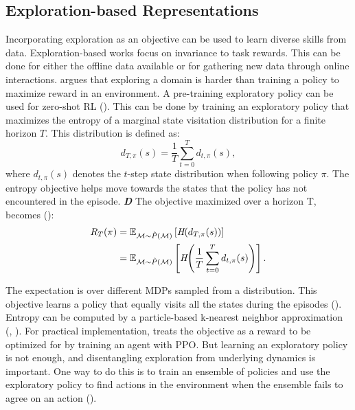 \documentclass{article}
\begin{document}
\subsection{Exploration-based Representations}
Incorporating exploration as an objective can be used to learn diverse skills from data. Exploration-based works focus on invariance to task rewards. This can be done for either the offline data available or for gathering new data through online interactions. 
\cite{zisselman2023explore} argues that exploring a domain is harder than training a policy to maximize reward in an environment. A pre-training exploratory policy can be used for zero-shot RL (\cite{zisselman2023explore}). This can be done by training an exploratory policy that maximizes the entropy of a marginal state visitation distribution for a finite horizon $T$. This distribution is defined as:
\begin{equation}
d_{T,\pi}(s) = \frac{1}{T} \sum_{t=0}^{T} d_{t,\pi}(s),
\end{equation}
where $d_{t,\pi}(s)$ denotes the $t$-step state distribution when following policy $\pi$. The entropy objective helps move towards the states that the policy has not encountered in the episode. \textbf{\textit{D}} The objective maximized over a horizon T, becomes (\cite{zisselman2023explore}):
\begin{align}
R_T(\pi) 
&= \mathbb{E}_{\mathcal{M} \sim \hat{P}(\mathcal{M})}
  \left[ \emph{H}( d_{T, \pi}(s)) \right] \\
&= \mathbb{E}_{\mathcal{M} \sim \hat{P}(\mathcal{M})}
  \left[
    \emph{H}\!\left( \frac{1}{T} \sum_{t=0}^{T} d_{t,\pi}(s) \right)
  \right].
\end{align}

The expectation is over different MDPs sampled from a distribution. This objective learns a policy that equally visits all the states during the episodes (\cite{zisselman2023explore}). Entropy can be computed by a particle-based k-nearest neighbor approximation (\cite{zisselman2023explore}, \cite{yarats2021reinforcement}). For practical implementation, \cite{zisselman2023explore} treats the objective as a reward to be optimized for by training an agent with PPO. But learning an exploratory policy is not enough, and disentangling exploration from underlying dynamics is important. One way to do this is to train an ensemble of policies and use the exploratory policy to find actions in the environment when the ensemble fails to agree on an action (\cite{zisselman2023explore}).
\end{document}
